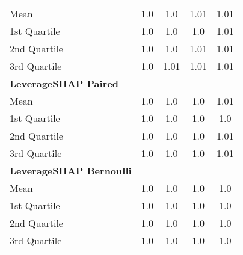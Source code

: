 {\begin{tabular} {lcccc}
\hspace{7pt}Mean & 1.0 & 1.0 & 1.01 & 1.01 \\ 
\hspace{7pt}1st Quartile & 1.0 & 1.0 & 1.0 & 1.01 \\ 
\hspace{7pt}2nd Quartile & 1.0 & 1.0 & 1.01 & \cellcolor{bronze!60}1.01 \\ 
\hspace{7pt}3rd Quartile & 1.0 & 1.01 & 1.01 & 1.01 \\ 
\addlinespace[1ex] 
\textbf{LeverageSHAP Paired} &  &  &  &  \\ 
\hspace{7pt}Mean & \cellcolor{bronze!60}1.0 & \cellcolor{bronze!60}1.0 & \cellcolor{bronze!60}1.0 & \cellcolor{bronze!60}1.01 \\ 
\hspace{7pt}1st Quartile & 1.0 & \cellcolor{bronze!60}1.0 & \cellcolor{bronze!60}1.0 & \cellcolor{bronze!60}1.0 \\ 
\hspace{7pt}2nd Quartile & 1.0 & \cellcolor{bronze!60}1.0 & \cellcolor{silver!60}1.0 & 1.01 \\ 
\hspace{7pt}3rd Quartile & \cellcolor{bronze!60}1.0 & \cellcolor{bronze!60}1.0 & \cellcolor{bronze!60}1.0 & 1.01 \\ 
\addlinespace[1ex] 
\textbf{LeverageSHAP Bernoulli} &  &  &  &  \\ 
\hspace{7pt}Mean & \cellcolor{gold!60}1.0 & \cellcolor{gold!60}1.0 & \cellcolor{gold!60}1.0 & \cellcolor{silver!60}1.0 \\ 
\hspace{7pt}1st Quartile & \cellcolor{gold!60}1.0 & \cellcolor{gold!60}1.0 & \cellcolor{gold!60}1.0 & \cellcolor{gold!60}1.0 \\ 
\hspace{7pt}2nd Quartile & \cellcolor{silver!60}1.0 & \cellcolor{gold!60}1.0 & \cellcolor{gold!60}1.0 & \cellcolor{gold!60}1.0 \\ 
\hspace{7pt}3rd Quartile & \cellcolor{gold!60}1.0 & \cellcolor{gold!60}1.0 & \cellcolor{gold!60}1.0 & \cellcolor{silver!60}1.0 \\ 
\bottomrule
\end{tabular}}